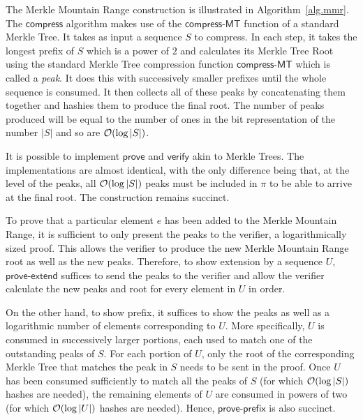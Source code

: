 The Merkle Mountain Range construction is illustrated in
Algorithm~\ref{alg.mmr}. The $\textsf{compress}$ algorithm makes use of the
$\textsf{compress-MT}$ function of a standard Merkle Tree. It takes as input a
sequence $S$ to compress. In each step, it
takes the longest prefix of $S$ which is a power of $2$ and calculates its
Merkle Tree Root using the standard Merkle Tree compression function
$\textsf{compress-MT}$ which is called a \emph{peak}. It does this with
successively smaller prefixes until the whole sequence is consumed. It then
collects all of these peaks by concatenating them together and hashies them to
produce the final root. The number of peaks produced will be equal to the number
of ones in the bit representation of the number $|S|$ and so are
$\mathcal{O}(\log|S|)$.



It is possible to implement $\textsf{prove}$ and $\textsf{verify}$ akin to
Merkle Trees. The implementations are almost identical, with the only difference
being that, at the level of the peaks, all $\mathcal{O}(\log|S|)$ peaks must be
included in $\pi$ to be able to arrive at the final root. The construction
remains succinct.

To prove that a particular element $e$ has been added to the Merkle Mountain
Range, it is sufficient to only present the peaks to the verifier, a
logarithmically sized proof. This allows the verifier to produce the new Merkle
Mountain Range root as well as the new peaks. Therefore, to show extension by a
sequence $U$, $\textsf{prove-extend}$ suffices to send the peaks to the verifier
and allow the verifier calculate the new peaks and root for every element in $U$
in order.

On the other hand, to show prefix, it suffices to show the peaks as
well as a logarithmic number of elements corresponding to $U$. More
specifically, $U$ is consumed in successively larger portions, each used to
match one of the outstanding peaks of $S$. For each portion of $U$, only the
root of the corresponding Merkle Tree that matches the peak in $S$ needs to be
sent in the proof. Once $U$ has been consumed sufficiently to match all the
peaks of $S$ (for which $\mathcal{O}(\log|S|)$ hashes are needed), the remaining elements of
$U$ are consumed in powers of two (for which $\mathcal{O}(\log|U|)$ hashes are
needed). Hence, $\textsf{prove-prefix}$ is also succinct.
